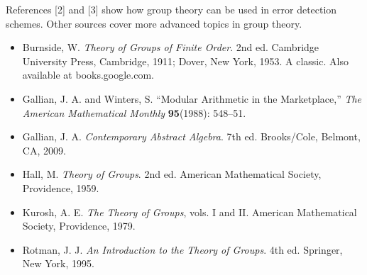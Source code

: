  
{\small
References [2] and [3] show  how group theory can be used in error
detection schemes.  Other sources cover more advanced
topics in group theory. 
\begin{itemize}
 
\item[{\bf [1]}]  %
Burnside, W. {\it Theory of Groups of Finite Order}. 2nd ed. Cambridge
University Press, Cambridge, 1911; Dover, New York, 1953.  A classic.  Also available at books.google.com.
 
\item[{\bf [2]}]
Gallian, J. A. and Winters, S. ``Modular Arithmetic in the
Marketplace,'' {\it The American Mathematical Monthly} {\bf
95}(1988): 548--51. 
 
\item[{\bf [3]}]  %
Gallian, J. A. 
{\it Contemporary Abstract Algebra}. 7th ed. Brooks/Cole, Belmont, CA, 2009. 
 
\item[{\bf [4]}]   %
Hall, M. {\it Theory of Groups}. 2nd ed. American Mathematical Society, Providence, 1959.

 
\item[{\bf [5]}] %
Kurosh, A. E. {\it The Theory of Groups}, vols. I and II. American Mathematical Society, Providence, 1979. 
 
 

% 
 
 
\item[{\bf [6]}] %
Rotman, J. J. {\it An Introduction to the Theory of
Groups}. 4th ed. Springer, New York, 1995.
 
\end{itemize}
}
 
\sagesection
